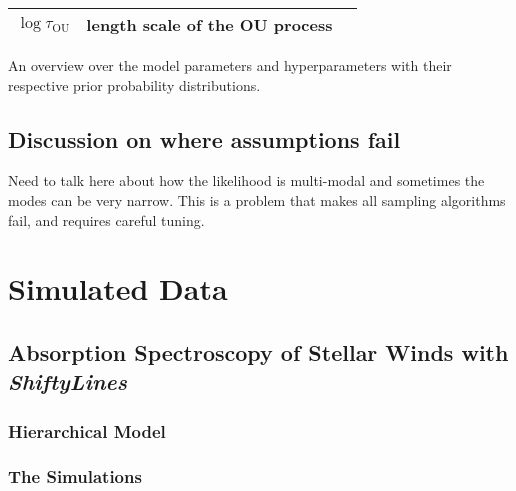\documentclass[12pt]{emulateapj}
\begin{document}
\begin{table*}[hbtp]
\begin{threeparttable}
\begin{tabularx}{\textwidth}{p{4.0cm}p{7.0cm}X}
$\log{\tau_{\mathrm{OU}}}$ & length scale of the OU process & \\
\bottomrule
\end{tabularx}
   \begin{tablenotes}
      \item{An overview over the model parameters and hyperparameters with their respective prior probability distributions.}
\end{tablenotes}
\end{threeparttable}
\label{tab:priortable}
\end{table*}


\subsection{Discussion on where assumptions fail}

Need to talk here about how the likelihood is multi-modal and sometimes the modes can be very narrow. 
This is a problem that makes all sampling algorithms fail, and requires careful tuning.


\section{Simulated Data}

\subsection{Absorption Spectroscopy of Stellar Winds with \textit{ShiftyLines}}

\subsubsection{Hierarchical Model}

\subsubsection{The Simulations}
\end{document}
